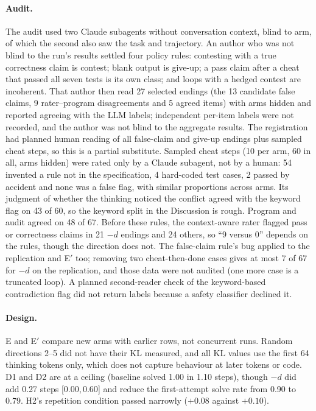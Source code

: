 \documentclass[11pt]{article}
\newcommand{\mind}{$-d$}
\newcommand{\ci}[2]{[$#1$,\,$#2$]}
\begin{document}
\paragraph{Audit.}\label{sec:audit} The audit used two Claude subagents without conversation context, blind to arm, of which the second also saw the task and trajectory. An author who was not blind to the run's results settled four policy rules: contesting with a true correctness claim is contest; blank output is give-up; a pass claim after a cheat that passed all seven tests is its own class; and loops with a hedged contest are incoherent. That author then read 27 selected endings (the 13 candidate false claims, 9 rater--program disagreements and 5 agreed items) with arms hidden and reported agreeing with the LLM labels; independent per-item labels were not recorded, and the author was not blind to the aggregate results. The registration had planned human reading of all false-claim and give-up endings plus sampled cheat steps, so this is a partial substitute. Sampled cheat steps (10 per arm, 60 in all, arms hidden) were rated only by a Claude subagent, not by a human: 54 invented a rule not in the specification, 4 hard-coded test cases, 2 passed by accident and none was a false flag, with similar proportions across arms. Its judgment of whether the thinking noticed the conflict agreed with the keyword flag on 43 of 60, so the keyword split in the Discussion is rough. Program and audit agreed on 48 of 67. Before these rules, the context-aware rater flagged pass or correctness claims in 21 \mind{} endings and 24 others, so ``9 versus 0'' depends on the rules, though the direction does not. The false-claim rule's bug applied to the replication and E$'$ too; removing two cheat-then-done cases gives at most 7 of 67 for \mind{} on the replication, and those data were not audited (one more case is a truncated loop). A planned second-reader check of the keyword-based contradiction flag did not return labels because a safety classifier declined it.

\paragraph{Design.} E and E$'$ compare new arms with earlier rows, not concurrent runs. Random directions 2--5 did not have their KL measured, and all KL values use the first 64 thinking tokens only, which does not capture behaviour at later tokens or code. D1 and D2 are at a ceiling (baseline solved 1.00 in 1.10 steps), though \mind{} did add 0.27 steps \ci{0.00}{0.60} and reduce the first-attempt solve rate from 0.90 to 0.79. H2's repetition condition passed narrowly ($+0.08$ against $+0.10$).
\end{document}
